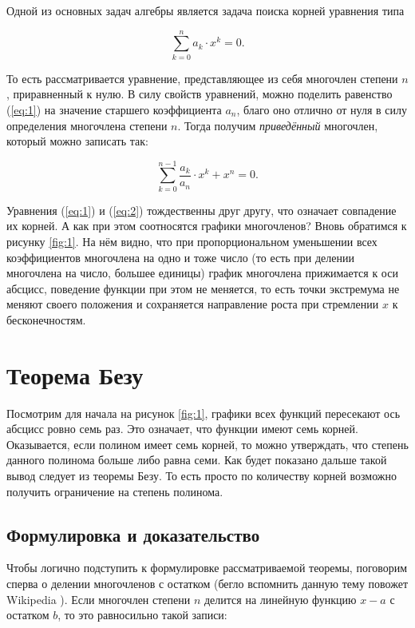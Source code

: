 \documentclass[12pt]{article}
\begin{document}
\par
Одной из основных задач алгебры является задача поиска корней уравнения типа

\begin{equation}\label{eq:1}
\sum_{k=0}^n{a_k \cdot x^k} = 0.
\end{equation}

То есть рассматривается уравнение, представляющее из себя многочлен степени $n$, приравненный к нулю. В силу свойств уравнений, можно поделить равенство (\ref{eq:1}) на значение старшего коэффициента $a_n$, благо оно отлично от нуля в силу определения многочлена степени $n$. Тогда получим \emph{приведённый} многочлен, который можно записать так:

\begin{equation}\label{eq:2}
\sum_{k=0}^{n-1}{\dfrac{a_k}{a_n} \cdot x^k} + x^n = 0.
\end{equation}

Уравнения (\ref{eq:1}) и (\ref{eq:2}) тождественны друг другу, что означает совпадение их корней. А как при этом соотносятся графики многочленов? Вновь обратимся к рисунку \ref{fig:1}. На нём видно, что при пропорциональном уменьшении всех коэффициентов многочлена на одно и тоже число (то есть при делении многочлена на число, большее единицы) график многочлена прижимается к оси абсцисс, поведение функции при этом не меняется, то есть точки экстремума не меняют своего положения и сохраняется направление роста при стремлении $x$ к бесконечностям.

\section{Теорема Безу}
Посмотрим для начала на рисунок \ref{fig:1}, графики всех функций пересекают ось абсцисс ровно семь раз. Это означает, что функции имеют семь корней. Оказывается, если полином имеет семь корней, то можно утверждать, что степень данного полинома больше либо равна семи. Как будет показано дальше такой вывод следует из теоремы Безу. То есть просто по количеству корней возможно получить ограничение на степень полинома.

\subsection{Формулировка и доказательство}
Чтобы логично подступить к формулировке рассматриваемой теоремы, поговорим сперва о делении многочленов с остатком (бегло вспомнить данную тему повожет Wikipedia \cite{poly_div}). Если многочлен степени $n$ делится на линейную функцию $x-a$ с остатком $b$, то это равносильно такой записи:
\end{document}
